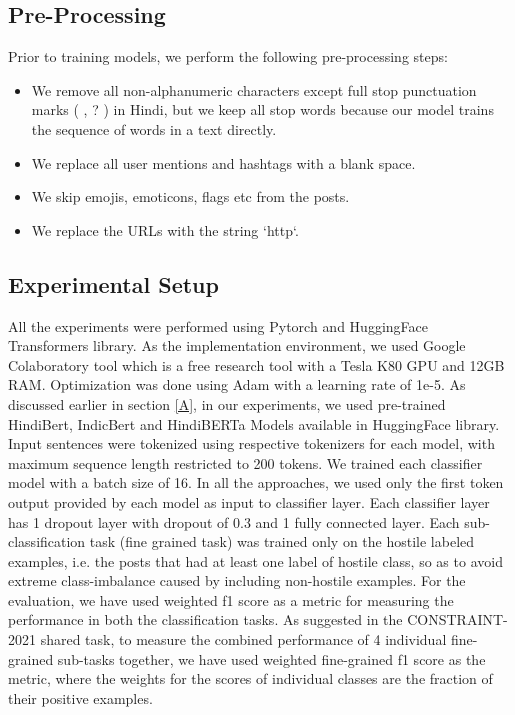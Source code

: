 \documentclass[runningheads]{llncs}
\begin{document}
\subsection{Pre-Processing}
Prior to training models, we perform the following pre-processing steps:
\begin{itemize}
    \item[] We remove all non-alphanumeric characters except full stop punctuation marks ( {} , ? ) in Hindi, but we keep all stop words because our model trains the sequence of words in a text directly.
    \item[] We replace all user mentions and hashtags with a blank space.
    \item[] We skip emojis, emoticons, flags etc from the posts.
    \item[] We replace the URLs with the string `http`. 
    
\end{itemize}

\subsection{Experimental Setup}
\label{Ex}
All the experiments were performed using Pytorch \cite{ref_Pytorch} and HuggingFace \cite{ref_huggingface} Transformers library. As the implementation environment, we used Google Colaboratory tool which is a free research tool with a Tesla K80 GPU and 12GB RAM. Optimization was done using Adam \cite{adam} with a learning rate of 1e-5. As discussed earlier in section \ref{A}, in our experiments, we used pre-trained HindiBert\cite{HindiBERT}, IndicBert\cite{ref_indic_Nlp} and HindiBERTa \cite{HindiBERTa} Models available in HuggingFace library. Input sentences were tokenized using respective tokenizers for each model, with maximum sequence length restricted to 200 tokens. We trained each classifier model with a batch size of 16. In all the approaches, we used only the first token output provided by each model as input to classifier layer. Each classifier layer has 1 dropout layer with dropout of 0.3 and 1 fully connected layer. Each sub-classification task (fine grained task) was trained only on the hostile labeled examples, i.e. the posts that had at least one label of hostile class, so as to avoid extreme class-imbalance caused by including non-hostile examples. For the evaluation, we have used weighted f1 score \cite{scikit-learn} as a metric for measuring the performance in both the classification tasks. As suggested in the CONSTRAINT-2021 shared task\cite{patwa2021overview}, to measure the combined performance of 4 individual fine-grained sub-tasks together, we have used weighted fine-grained f1 score as the metric, where the weights for the scores of individual classes are the fraction of their positive examples.
\end{document}
